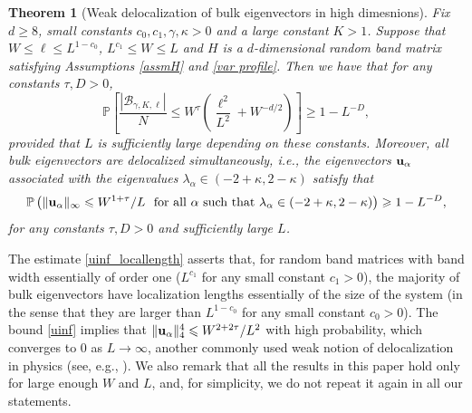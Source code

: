 \documentclass{article}
\newcommand{\1}{\mathds{1}}
\numberwithin{equation}{section}
\newcommand{\bu}{{\bf{u}}}
\newcommand{\al}{\alpha}
\newcommand{\be}{\begin{equation}}
\newcommand{\ee}{\end{equation}}
\renewcommand{\leq}{\leqslant}
\renewcommand{\geq}{\geqslant}
\renewcommand{\le}{\leq}
\renewcommand{\ge}{\geq}
\DeclareMathOperator{\re}{Re}
\DeclareMathOperator{\im}{Im}
\theoremstyle{plain} %
\newtheorem{theorem}{Theorem}[section]
\theoremstyle{remark}
\newcommand{\cor}{\color{red}}
\newcommand{\hty}[1]{{\cor (ht: #1) }}
\begin{document}
\begin{theorem}[Weak delocalization of bulk eigenvectors in high dimesnions]\label{comp_delocal}
	Fix $d\ge 8$, small constants $c_0, c_1, \gamma, \kappa>0$ and a large constant $K > 1$.  Suppose that $W\le  \ell \le L^{1 - c_0}$,  $L^{c_1} \le W \le L$ and $H$ is a $d$-dimensional random band matrix satisfying Assumptions \ref{assmH} and \ref{var profile}. 
	Then we have that for any constants $\tau,D>0$,
	\be\label{uinf_locallength}  \mathbb P \left[ \frac{|\mathcal B_{\gamma,K,\ell}|}{N} \le W^\tau \left(\frac{\ell^2}{L^2} + W^{-d/2}\right)\right] \ge 1-L^{-D},%
	\ee
	provided that $L$ is sufficiently  large  depending on these constants. Moreover, %
	all bulk eigenvectors are delocalized simultaneously, i.e., the eigenvectors $\bu_\al$ associated with the eigenvalues $\lambda_\al\in (-2+\kappa,2-\kappa)$ satisfy that
	\be\label{uinf}
	\mathbb P \left(\|\bu_\al\|_\infty \le W^{1+\tau}/L \ \ \text{for all $\al$ such that $\lambda_\al\in (-2+\kappa,2-\kappa)$}\right)\ge  1-L^{-D} ,
	\ee
	for any constants $ \tau, D>0$ and sufficiently large $L$.
\end{theorem}


The estimate \eqref{uinf_locallength} asserts that, for random band matrices with band width essentially of order one ($L^{c_1}$ 
for any small constant $c_1> 0$), the majority of bulk eigenvectors have localization lengths essentially of the size of the system (in the sense that they are larger than $L^{1 - c_0}$ for any small constant $c_0 > 0$). The bound \eqref{uinf} implies that $\|\bu_\al\|_4^4\le W^{2+2\tau}/L^2$ with high probability, which converges to 0 as $L\to \infty$, another commonly used weak notion of delocalization in physics (see, e.g., \cite{Spencer2}).  We also remark that all the results in this paper hold only for large enough $W$ and $L$, and, for simplicity, we do not repeat it again in all our statements. 
\end{document}
